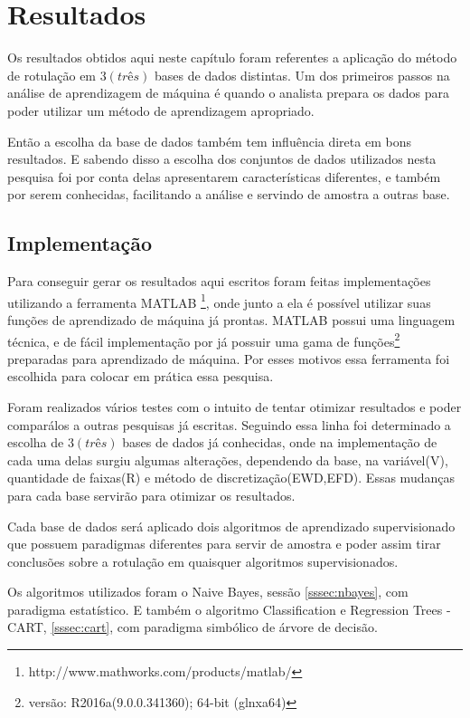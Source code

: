 \chapter{Resultados}\label{cap:resultados}

Os resultados obtidos aqui neste capítulo foram referentes a aplicação do método de rotulação em ${3(três)}$ bases de dados distintas. Um dos primeiros passos na análise de aprendizagem de máquina é quando o analista prepara os dados para poder utilizar  um método de aprendizagem apropriado. 

Então  a escolha da base de dados também tem influência direta em bons resultados. E sabendo disso a escolha dos conjuntos de dados utilizados nesta pesquisa foi por conta delas apresentarem características diferentes, e também por serem conhecidas, facilitando a análise e servindo de amostra a outras base.

\section{Implementação}

Para conseguir gerar os resultados aqui escritos foram feitas implementações utilizando a ferramenta MATLAB \footnote{http://www.mathworks.com/products/matlab/}, onde junto  a ela é possível utilizar suas funções de aprendizado de máquina já prontas. MATLAB possui uma linguagem técnica, e de fácil implementação por já possuir uma gama de funções\footnote{versão: R2016a(9.0.0.341360); 64-bit (glnxa64)} preparadas para aprendizado de máquina. Por esses motivos essa ferramenta foi escolhida para colocar em prática essa pesquisa.

Foram realizados vários testes com o intuito de tentar otimizar resultados e poder comparálos a outras pesquisas já escritas. Seguindo essa linha foi determinado a escolha de ${3(três)}$ bases de dados já conhecidas, onde na implementação de cada uma delas surgiu algumas alterações, dependendo da base, na variável(V), quantidade de faixas(R) e método de discretização(EWD,EFD). Essas mudanças para cada base servirão para otimizar os resultados. 

Cada base de dados será aplicado dois algoritmos de aprendizado supervisionado que possuem paradigmas diferentes para servir de amostra e poder assim tirar conclusões sobre a rotulação em quaisquer algoritmos supervisionados.  

Os algoritmos utilizados foram o Naive Bayes, sessão \ref{sssec:nbayes}, com paradigma estatístico. E também o algoritmo Classification e Regression Trees - CART, \ref{sssec:cart}, com paradigma simbólico de  árvore de decisão.

